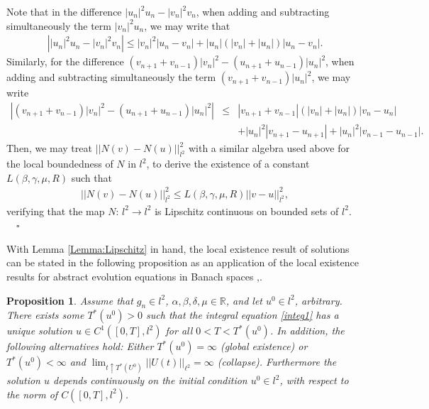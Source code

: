 \documentclass[preprintnumbers,amsmath,amssymb]{revtex4}
\newtheorem{proposition}{Proposition}[section]
\begin{document}
Note that in the difference $|u_n|^2u_n-|v_n|^2v_n$, when adding and subtracting simultaneously the term $|v_n|^2u_n$, we may write that 
\begin{eqnarray*}
\left||u_n|^2u_n-|v_n|^2v_n\right|\leq |v_n|^2|u_n-v_n|+|u_n|\left(|v_n|+|u_n|\right)|u_n-v_n|.
\end{eqnarray*}	
Similarly, for the difference $(v_{n+1}+v_{n-1})|v_n|^2-(u_{n+1}+u_{n-1})|u_n|^2$, when adding and subtracting simultaneously the term $(v_{n+1}+v_{n-1})|u_n|^2$, we may write
\begin{eqnarray*}
\left|(v_{n+1}+v_{n-1})|v_n|^2-(u_{n+1}+u_{n-1})|u_n|^2\right|&\leq& |v_{n+1}+v_{n-1}|\left(|v_n|+|u_n|\right)|v_n-u_n|\\
&&+|u_n|^2|v_{n+1}-u_{n+1}|+|u_n|^2|v_{n-1}-u_{n-1}|.	
\end{eqnarray*}	
Then, we may treat $|| N(v)-N(u)||_{l^2}^2$ with a similar algebra used above for the local boundedness of $N$ in $l^2$, to derive the existence of a constant $L(\beta,\gamma, \mu, R)$ such that 
\begin{eqnarray*}
|| N(v)-N(u)||_{l^2}^2\leq L(\beta,\gamma, \mu, R) ||v-u||_{l^2}^2,
\end{eqnarray*}	
verifying that the map $N:\,l^2\rightarrow l^2$ is Lipschitz continuous on bounded sets of $l^2$. \ \ $\square$

With Lemma \ref{Lemma:Lipschitz} in hand, the local existence result of solutions can be stated in the following proposition as an application of the local existence results for abstract evolution equations in Banach spaces \cite{Pazy83},\cite{Zeidler}. 
\begin{proposition} 
	\label{thloc}	
	Assume that $g_n\in l^2$, $\alpha,\beta, \delta, \mu\in\mathbb{R}$, and let $u^0\in l^2$, arbitrary. There exists some $T^*(u^0)>0$ such that the integral equation \eqref{integ1} has a unique solution $u\in C^1([0,T],l^2)$  for all $0<T<T^*(u^0)$. In addition, the following alternatives hold: Either $T^*(u^0)=\infty$ (global existence) or $T^*(u^0)<\infty$ and $\lim_{t\uparrow T^*(U^0)}||U(t)||_{\ell^2}=\infty$ (collapse). Furthermore the solution $u$ depends continuously on the initial condition $u^0\in l^2$, with respect to the norm of $C([0,T],l^2)$.
\end{proposition}
%
\end{document}
